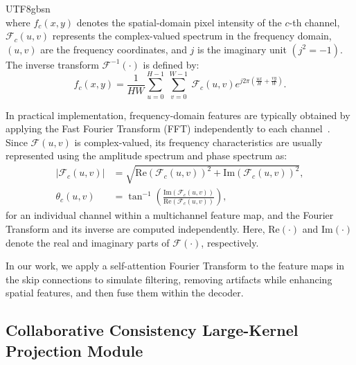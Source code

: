 \documentclass[times, review, 10pt]{elsarticle}
\begin{document}
\begin{CJK}{UTF8}{gbsn}
\begin{equation}
\end{equation}
where $ f_c(x, y) $ denotes the spatial-domain pixel intensity of the $ c $-th channel, $ \mathcal{F}_c(u, v) $ represents the complex-valued spectrum in the frequency domain, $ (u, v) $ are the frequency coordinates, and $ j $ is the imaginary unit $(j^2 = -1)$. The inverse transform $ \mathcal{F}^{-1}(\cdot) $ is defined by:
\begin{equation}
f_c(x,y)=\frac{1}{HW}\sum_{u=0}^{H-1}\ \sum_{v=0}^{W-1}\ \mathcal{F}_c(u,v)e^{j2\pi(\frac{ux}{H}+\frac{vy}{W})}.
\end{equation} \par
In practical implementation, frequency-domain features are typically obtained by applying the Fast Fourier Transform (FFT) independently to each channel~\cite{ref40}. Since $ \mathcal{F}(u, v) $ is complex-valued, its frequency characteristics are usually represented using the amplitude spectrum and phase spectrum as:
\begin{equation}
\begin{split}
\left|\mathcal{F}_c\left(u,v\right)\right|&=\sqrt{\mathrm{Re}(\mathcal{F}_c(u,v))^2+\mathrm{Im}(\mathcal{F}_c(u,v))^2}, \\
\theta_c(u,v)&=\tan^{-1}(\frac{\mathrm{Im}(\mathcal{F}_c(u,v))}{\mathrm{Re}(\mathcal{F}_c(u,v))}),
\end{split}
\end{equation}
for an individual channel within a multichannel feature map, and the Fourier Transform and its inverse are computed independently. Here, $ \mathrm{Re}(\cdot) $ and $ \mathrm{Im}(\cdot) $ denote the real and imaginary parts of $ \mathcal{F}(\cdot) $, respectively.
\par
In our work, we apply a self-attention Fourier Transform to the feature maps in the skip connections to simulate filtering, removing artifacts while enhancing spatial features, and then fuse them within the decoder.
\subsection{Collaborative Consistency Large-Kernel Projection Module}


\end{CJK}
\end{document}
